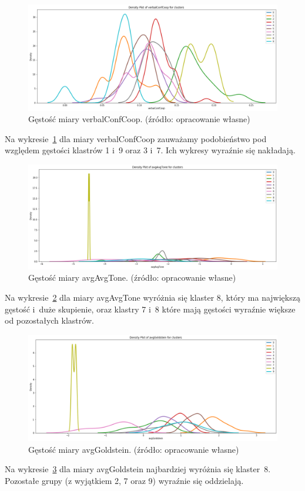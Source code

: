 \documentclass[11pt]{report}
\begin{document}
    \begin{figure}[!htp]
        \centering
        \includegraphics[width=\linewidth]{fig/CLUST/density_verbalConfCoop.png}
        \caption{Gęstość miary verbalConfCoop. (źródło: opracowanie własne)}
        \label{fig:density_verbalconfcoop}
    \end{figure}
    Na wykresie~\ref{fig:density_verbalconfcoop} dla miary verbalConfCoop zauważamy podobieństwo pod względem gęstości klastrów 1 i~9 oraz 3 i~7.
    Ich wykresy wyraźnie się nakładają.

    \begin{figure}[!htp]
        \centering
        \includegraphics[width=\linewidth]{fig/CLUST/density_avgAvgTone.png}
        \caption{Gęstość miary avgAvgTone. (źródło: opracowanie własne)}
        \label{fig:density_avgavgtone}
    \end{figure}
    Na wykresie~\ref{fig:density_avgavgtone} dla miary avgAvgTone wyróżnia się klaster 8, który ma największą gęstość i~duże skupienie, oraz klastry 7 i~8 które mają gęstości wyraźnie większe od pozostałych klastrów.

    \begin{figure}[!htp]
        \centering
        \includegraphics[width=\linewidth]{fig/CLUST/density_avgGoldstein.png}
        \caption{Gęstość miary avgGoldstein. (źródło: opracowanie własne)}
        \label{fig:density_avggoldstein}
    \end{figure}
    Na wykresie~\ref{fig:density_avggoldstein} dla miary avgGoldstein najbardziej wyróżnia się klaster~8.
    Pozostałe grupy (z wyjątkiem 2, 7 oraz 9) wyraźnie się oddzielają.
\end{document}
